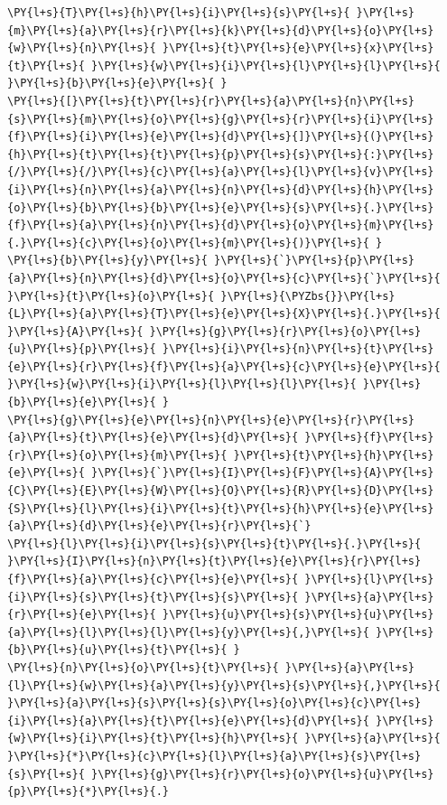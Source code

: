 \begin{tcolorbox}[breakable, size=fbox, boxrule=1pt, pad at break*=1mm,colback=cellbackground, colframe=cellborder]
\begin{Verbatim}[commandchars=\\\{\}]
\PY{l+s}{T}\PY{l+s}{h}\PY{l+s}{i}\PY{l+s}{s}\PY{l+s}{ }\PY{l+s}{m}\PY{l+s}{a}\PY{l+s}{r}\PY{l+s}{k}\PY{l+s}{d}\PY{l+s}{o}\PY{l+s}{w}\PY{l+s}{n}\PY{l+s}{ }\PY{l+s}{t}\PY{l+s}{e}\PY{l+s}{x}\PY{l+s}{t}\PY{l+s}{ }\PY{l+s}{w}\PY{l+s}{i}\PY{l+s}{l}\PY{l+s}{l}\PY{l+s}{ }\PY{l+s}{b}\PY{l+s}{e}\PY{l+s}{ }
\PY{l+s}{[}\PY{l+s}{t}\PY{l+s}{r}\PY{l+s}{a}\PY{l+s}{n}\PY{l+s}{s}\PY{l+s}{m}\PY{l+s}{o}\PY{l+s}{g}\PY{l+s}{r}\PY{l+s}{i}\PY{l+s}{f}\PY{l+s}{i}\PY{l+s}{e}\PY{l+s}{d}\PY{l+s}{]}\PY{l+s}{(}\PY{l+s}{h}\PY{l+s}{t}\PY{l+s}{t}\PY{l+s}{p}\PY{l+s}{s}\PY{l+s}{:}\PY{l+s}{/}\PY{l+s}{/}\PY{l+s}{c}\PY{l+s}{a}\PY{l+s}{l}\PY{l+s}{v}\PY{l+s}{i}\PY{l+s}{n}\PY{l+s}{a}\PY{l+s}{n}\PY{l+s}{d}\PY{l+s}{h}\PY{l+s}{o}\PY{l+s}{b}\PY{l+s}{b}\PY{l+s}{e}\PY{l+s}{s}\PY{l+s}{.}\PY{l+s}{f}\PY{l+s}{a}\PY{l+s}{n}\PY{l+s}{d}\PY{l+s}{o}\PY{l+s}{m}\PY{l+s}{.}\PY{l+s}{c}\PY{l+s}{o}\PY{l+s}{m}\PY{l+s}{)}\PY{l+s}{ }
\PY{l+s}{b}\PY{l+s}{y}\PY{l+s}{ }\PY{l+s}{`}\PY{l+s}{p}\PY{l+s}{a}\PY{l+s}{n}\PY{l+s}{d}\PY{l+s}{o}\PY{l+s}{c}\PY{l+s}{`}\PY{l+s}{ }\PY{l+s}{t}\PY{l+s}{o}\PY{l+s}{ }\PY{l+s}{\PYZbs{}}\PY{l+s}{L}\PY{l+s}{a}\PY{l+s}{T}\PY{l+s}{e}\PY{l+s}{X}\PY{l+s}{.}\PY{l+s}{ }\PY{l+s}{A}\PY{l+s}{ }\PY{l+s}{g}\PY{l+s}{r}\PY{l+s}{o}\PY{l+s}{u}\PY{l+s}{p}\PY{l+s}{ }\PY{l+s}{i}\PY{l+s}{n}\PY{l+s}{t}\PY{l+s}{e}\PY{l+s}{r}\PY{l+s}{f}\PY{l+s}{a}\PY{l+s}{c}\PY{l+s}{e}\PY{l+s}{ }\PY{l+s}{w}\PY{l+s}{i}\PY{l+s}{l}\PY{l+s}{l}\PY{l+s}{ }\PY{l+s}{b}\PY{l+s}{e}\PY{l+s}{ }
\PY{l+s}{g}\PY{l+s}{e}\PY{l+s}{n}\PY{l+s}{e}\PY{l+s}{r}\PY{l+s}{a}\PY{l+s}{t}\PY{l+s}{e}\PY{l+s}{d}\PY{l+s}{ }\PY{l+s}{f}\PY{l+s}{r}\PY{l+s}{o}\PY{l+s}{m}\PY{l+s}{ }\PY{l+s}{t}\PY{l+s}{h}\PY{l+s}{e}\PY{l+s}{ }\PY{l+s}{`}\PY{l+s}{I}\PY{l+s}{F}\PY{l+s}{A}\PY{l+s}{C}\PY{l+s}{E}\PY{l+s}{W}\PY{l+s}{O}\PY{l+s}{R}\PY{l+s}{D}\PY{l+s}{S}\PY{l+s}{l}\PY{l+s}{i}\PY{l+s}{t}\PY{l+s}{h}\PY{l+s}{e}\PY{l+s}{a}\PY{l+s}{d}\PY{l+s}{e}\PY{l+s}{r}\PY{l+s}{`}
\PY{l+s}{l}\PY{l+s}{i}\PY{l+s}{s}\PY{l+s}{t}\PY{l+s}{.}\PY{l+s}{ }\PY{l+s}{I}\PY{l+s}{n}\PY{l+s}{t}\PY{l+s}{e}\PY{l+s}{r}\PY{l+s}{f}\PY{l+s}{a}\PY{l+s}{c}\PY{l+s}{e}\PY{l+s}{ }\PY{l+s}{l}\PY{l+s}{i}\PY{l+s}{s}\PY{l+s}{t}\PY{l+s}{s}\PY{l+s}{ }\PY{l+s}{a}\PY{l+s}{r}\PY{l+s}{e}\PY{l+s}{ }\PY{l+s}{u}\PY{l+s}{s}\PY{l+s}{u}\PY{l+s}{a}\PY{l+s}{l}\PY{l+s}{l}\PY{l+s}{y}\PY{l+s}{,}\PY{l+s}{ }\PY{l+s}{b}\PY{l+s}{u}\PY{l+s}{t}\PY{l+s}{ }
\PY{l+s}{n}\PY{l+s}{o}\PY{l+s}{t}\PY{l+s}{ }\PY{l+s}{a}\PY{l+s}{l}\PY{l+s}{w}\PY{l+s}{a}\PY{l+s}{y}\PY{l+s}{s}\PY{l+s}{,}\PY{l+s}{ }\PY{l+s}{a}\PY{l+s}{s}\PY{l+s}{s}\PY{l+s}{o}\PY{l+s}{c}\PY{l+s}{i}\PY{l+s}{a}\PY{l+s}{t}\PY{l+s}{e}\PY{l+s}{d}\PY{l+s}{ }\PY{l+s}{w}\PY{l+s}{i}\PY{l+s}{t}\PY{l+s}{h}\PY{l+s}{ }\PY{l+s}{a}\PY{l+s}{ }\PY{l+s}{*}\PY{l+s}{c}\PY{l+s}{l}\PY{l+s}{a}\PY{l+s}{s}\PY{l+s}{s}\PY{l+s}{ }\PY{l+s}{g}\PY{l+s}{r}\PY{l+s}{o}\PY{l+s}{u}\PY{l+s}{p}\PY{l+s}{*}\PY{l+s}{.}


\end{Verbatim}
\end{tcolorbox}
